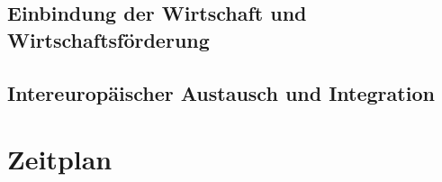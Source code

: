 
\subsection{Einbindung der Wirtschaft und Wirtschaftsförderung}


\subsection{Intereuropäischer Austausch und Integration}


\section{Zeitplan}


